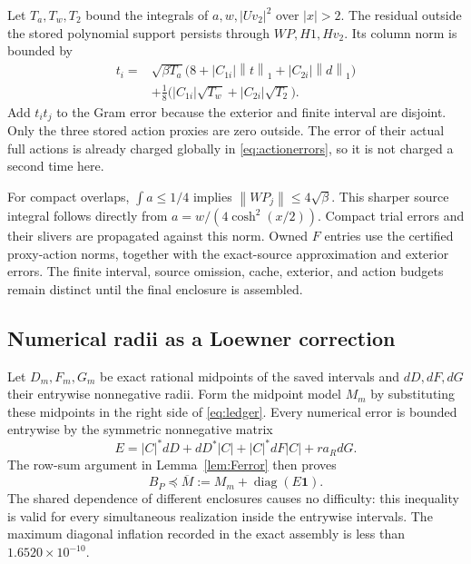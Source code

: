 \documentclass[11pt,a4paper]{article}
\numberwithin{equation}{section}
\theoremstyle{definition}\newtheorem{definition}[theorem]{Definition}
\theoremstyle{remark}\newtheorem{remark}[theorem]{Remark}
\newcommand{\norm}[1]{\left\|#1\right\|}
\newcommand{\diag}{\operatorname{diag}}
\newcommand{\Mbar}{\overline M}
\begin{document}
Let $T_a,T_w,T_2$ bound the integrals of $a,w,|Uv_2|^2$ over $|x|>2$. The residual outside the stored polynomial support persists through $WP,H1,Hv_2$. Its column norm is bounded by
\begin{align}\label{eq:exterior}
 t_i={}&\sqrt{\beta T_a}\bigl(8+|C_{1i}|\norm t_1+|C_{2i}|\norm d_1\bigr)\nonumber\\
 &+\tfrac18\bigl(|C_{1i}|\sqrt{T_w}+|C_{2i}|\sqrt{T_2}\bigr).
\end{align}
Add $t_it_j$ to the Gram error because the exterior and finite interval are disjoint. Only the three stored action proxies are zero outside. The error of their actual full actions is already charged globally in \eqref{eq:actionerrors}, so it is not charged a second time here.

For compact overlaps, $\int a\le1/4$ implies $\norm{WP_j}\le4\sqrt\beta$. This sharper source integral follows directly from $a=w/(4\cosh^2(x/2))$. Compact trial errors and their slivers are propagated against this norm. Owned $F$ entries use the certified proxy-action norms, together with the exact-source approximation and exterior errors. The finite interval, source omission, cache, exterior, and action budgets remain distinct until the final enclosure is assembled.

\subsection{Numerical radii as a Loewner correction}
Let $D_m,F_m,G_m$ be exact rational midpoints of the saved intervals and $dD,dF,dG$ their entrywise nonnegative radii. Form the midpoint model $M_m$ by substituting these midpoints in the right side of \eqref{eq:ledger}. Every numerical error is bounded entrywise by the symmetric nonnegative matrix
\begin{equation}\label{eq:numericalE}
 E=|C|^*dD+dD^*|C|+|C|^*dF|C|+ra_RdG.
\end{equation}
The row-sum argument in Lemma~\ref{lem:Ferror} then proves
\begin{equation}\label{eq:Mbar}
 B_P\preceq\Mbar:=M_m+\diag(E\mathbf1).
\end{equation}
The shared dependence of different enclosures causes no difficulty: this inequality is valid for every simultaneous realization inside the entrywise intervals. The maximum diagonal inflation recorded in the exact assembly is less than $1.6520\times10^{-10}$.
\end{document}
